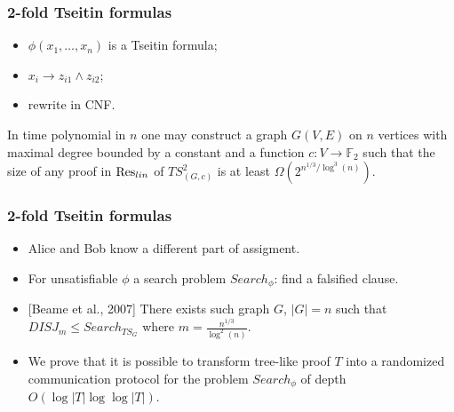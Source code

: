 \begin{frame}
    \frametitle{2-fold Tseitin formulas}

    \begin{itemize}
        \item $\phi(x_1, \dots, x_n)$ is a Tseitin formula;
        \item $x_i \to z_{i1} \land z_{i2}$;
    	\item rewrite in CNF.
	\end{itemize}

	\pause
    \begin{theorem}
        In time polynomial in $n$ one may construct a graph $G(V, E)$ on $n$ vertices with maximal degree bounded by a
        constant and a function $c: V \to \mathbb{F}_2$ such that the size of any  proof in
        $\mathrm{Res}_{lin}$ of $TS^2_{(G,c)}$ is at least $\Omega\left(2^{n^{1 / 3} / \log^3(n)} \right)$.
    \end{theorem}
\end{frame}

\begin{frame}
    \frametitle{2-fold Tseitin formulas}
    
    \begin{itemize}
        \item Alice and Bob know a different part of assigment.
        \pause
		\item For unsatisfiable $\phi$ a search problem $Search_\phi$: find a falsified clause.
        \pause
        \item{} [Beame et al., 2007] There exists such graph $G$, $|G| = n$ such that $DISJ_{m} \le Search_{TS_{G}}$
			where $m = \frac{n^{1 / 3}}{\log^2(n)}$.
		\item We prove that it is possible to transform tree-like proof $T$ into a randomized communication protocol for
			the problem $Search_\phi$ of depth $O(\log |T| \log\log |T|)$.
        \pause
	\end{itemize}
\end{frame}





